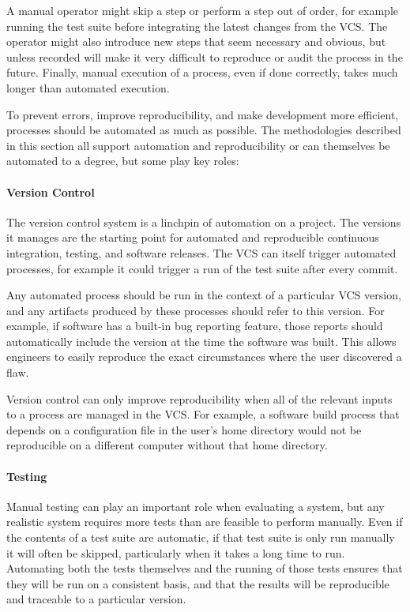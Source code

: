 A manual operator might skip a step or perform a step out of order,
for example running the test suite before integrating the latest
changes from the VCS. The operator might also introduce new steps that
seem necessary and obvious, but unless recorded will make it very
difficult to reproduce or audit the process in the future. Finally,
manual execution of a process, even if done correctly, takes much
longer than automated execution.

To prevent errors, improve reproducibility, and make development more
efficient, processes should be automated as much as possible. The
methodologies described in this section all support automation and
reproducibility or can themselves be automated to a degree, but some
play key roles:

\paragraph{Version Control}

The version control system is a linchpin of automation on a
project. The versions it manages are the starting point for automated
and reproducible continuous integration, testing, and software
releases. The VCS can itself trigger automated processes, for example
it could trigger a run of the test suite after every commit.

Any automated process should be run in the context of a particular VCS
version, and any artifacts produced by these processes should refer to
this version. For example, if software has a built-in bug reporting
feature, those reports should automatically include the version at the
time the software was built. This allows engineers to easily reproduce
the exact circumstances where the user discovered a flaw.

Version control can only improve reproducibility when all of the
relevant inputs to a process are managed in the VCS. For example, a
software build process that depends on a configuration file in the
user's home directory would not be reproducible on a different
computer without that home directory.

\paragraph{Testing}

Manual testing can play an important role when evaluating a system,
but any realistic system requires more tests than are feasible to
perform manually. Even if the contents of a test suite are automatic,
if that test suite is only run manually it will often be skipped,
particularly when it takes a long time to run. Automating both the
tests themselves and the running of those tests ensures that they will
be run on a consistent basis, and that the results will be
reproducible and traceable to a particular version.


